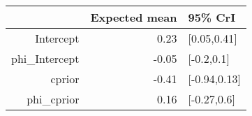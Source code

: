 \begin{tabular}{rrl}
  \hline
 & Expected mean & 95\% CrI \\ 
  \hline
Intercept & 0.23 & [0.05,0.41] \\ 
  phi\_Intercept & -0.05 & [-0.2,0.1] \\ 
  cprior & -0.41 & [-0.94,0.13] \\ 
  phi\_cprior & 0.16 & [-0.27,0.6] \\ 
   \hline
\end{tabular}

